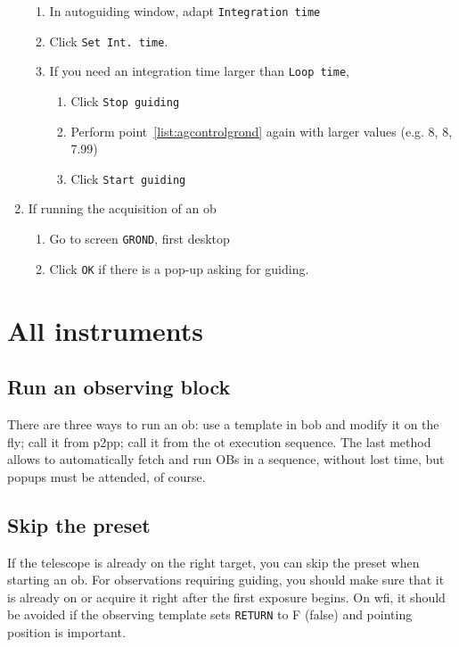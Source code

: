\documentclass[11pt,fleqn,a4paper]{book}
\begin{document}
\begin{enumerate}
\begin{enumerate}
        \item In \gls{autoguiding} window, adapt \texttt{Integration time}
        \item Click \texttt{Set Int. time}. 
        \item If you need an integration time larger than \texttt{Loop time},
            \begin{enumerate}
                \item Click \texttt{Stop guiding}
                \item Perform point~\ref{list:agcontrolgrond} again with larger values (e.g. 8, 8, 7.99)
                \item Click \texttt{Start guiding}
            \end{enumerate}
    \end{enumerate}
    \item If running the \gls{acquisition} of an \gls{ob}
    \begin{enumerate}
        \item Go to screen \texttt{GROND}, first \gls{desktop}
        \item Click \texttt{OK} if there is a pop-up asking for guiding.
    \end{enumerate}
\end{enumerate}

\section{All instruments}

\subsection{Run an observing block}

There are three ways to run an \gls{ob}: use a \gls{template} in \gls{bob} and modify it on the fly; call it from \gls{p2pp}; call it from the \gls{ot} execution sequence.  The last method allows to automatically fetch and run OBs in a sequence, without lost time, but popups must be attended, of course.



\subsection{Skip the preset}

If the telescope is already on the right target, you can skip the \gls{preset}
when starting an \gls{ob}. For observations requiring guiding, you should make sure
that it is already on or acquire it right after the first exposure begins.  On
\gls{wfi}, it should be avoided if the observing \gls{template} sets \texttt{RETURN}
to F (false) and \gls{pointing} position is important.
\end{document}
